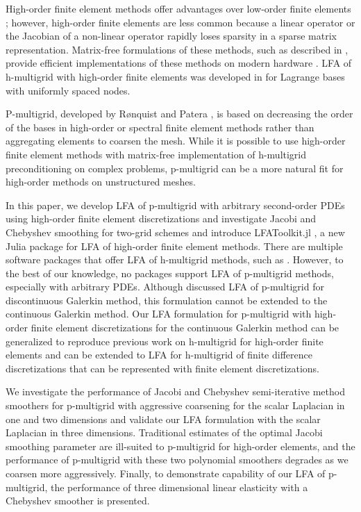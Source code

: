 \documentclass[review]{siamart190516}
\begin{document}
High-order finite element methods offer advantages over low-order finite elements \cite{demkowicz1989toward, oden1989toward, rachowicz1989toward}; however, high-order finite elements are less common because a linear operator or the Jacobian of a non-linear operator rapidly loses sparsity in a sparse matrix representation.
Matrix-free formulations of these methods, such as described in \cite{brown2010efficient, knoll2004jacobian}, provide efficient implementations of these methods on modern hardware \cite{libceed-user-manual, fischer2020scalability}.
LFA of h-multigrid with high-order finite elements was developed in \cite{he2020two} for Lagrange bases with uniformly spaced nodes.

P-multigrid, developed by R{\o}nquist and Patera \cite{ronquist1987spectral}, is based on decreasing the order of the bases in high-order or spectral finite element methods rather than aggregating elements to coarsen the mesh.
While it is possible \cite{davydov2019matrix} to use high-order finite element methods with matrix-free implementation of h-multigrid preconditioning on complex problems, p-multigrid can be a more natural fit for high-order methods on unstructured meshes.

In this paper, we develop LFA of p-multigrid with arbitrary second-order PDEs using high-order finite element discretizations and investigate Jacobi and Chebyshev smoothing for two-grid schemes and introduce LFAToolkit.jl \cite{thompson2021toolkit}, a new Julia package for LFA of high-order finite element methods.
There are multiple software packages that offer LFA of h-multigrid methods, such as \cite{rittich2018extending,kahl2020automated}.
However, to the best of our knowledge, no packages support LFA of p-multigrid methods, especially with arbitrary PDEs.
Although \cite{van2011discrete} discussed LFA of p-multigrid for discontinuous Galerkin method, this formulation cannot be extended to the continuous Galerkin method.
Our LFA formulation for p-multigrid with high-order finite element discretizations for the continuous Galerkin method can be generalized to reproduce previous work on h-multigrid for high-order finite elements \cite{he2020two} and can be extended to LFA for h-multigrid of finite difference discretizations that can be represented with finite element discretizations.

We investigate the performance of Jacobi and Chebyshev semi-iterative method smoothers for p-multigrid with aggressive coarsening for the scalar Laplacian in one and two dimensions and validate our LFA formulation with the scalar Laplacian in three dimensions.
Traditional estimates of the optimal Jacobi smoothing parameter are ill-suited to p-multigrid for high-order elements, and the performance of p-multigrid with these two polynomial smoothers degrades as we coarsen more aggressively.
Finally, to demonstrate capability of our LFA of p-multigrid, the performance of three dimensional linear elasticity with a Chebyshev smoother is presented.
\end{document}
